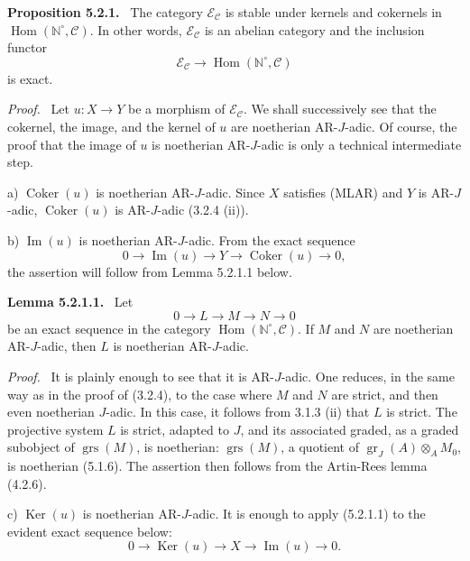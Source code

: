\documentclass[11pt]{article}
\newenvironment{statement}[1]{\par\medskip\noindent\textbf{#1.}\ }{\par\medskip}
\newenvironment{prooftext}[1][Proof]{\par\noindent\emph{#1.}\ }{\par\medskip}
\DeclareMathOperator{\Hom}{Hom}
\providecommand{\Ker}{\operatorname{Ker}}
\providecommand{\Coker}{\operatorname{Coker}}
\providecommand{\gr}{\operatorname{gr}}
\providecommand{\Hom}{\operatorname{Hom}}
\providecommand{\Im}{\operatorname{Im}}
\providecommand{\Ker}{\operatorname{Ker}}
\providecommand{\Coker}{\operatorname{Coker}}
\providecommand{\gr}{\operatorname{gr}}
\renewcommand{\Im}{\operatorname{Im}}
\providecommand{\gr}{\operatorname{gr}}
\providecommand{\grs}{\operatorname{grs}}
\providecommand{\Ker}{\operatorname{Ker}}
\providecommand{\Coker}{\operatorname{Coker}}
\providecommand{\Im}{\operatorname{Im}}
\begin{document}
\begin{statement}{Proposition 5.2.1}
The category \(\mathcal E_{\mathcal C}\) is stable under kernels and cokernels in \(\Hom(\mathbb N^\circ,\mathcal C)\). In other words, \(\mathcal E_{\mathcal C}\) is an abelian category and the inclusion functor
\[
\mathcal E_{\mathcal C}\longrightarrow \Hom(\mathbb N^\circ,\mathcal C)
\]
is exact.
\end{statement}

\begin{prooftext}
Let \(u:X\to Y\) be a morphism of \(\mathcal E_{\mathcal C}\). We shall successively see that the cokernel, the image, and the kernel of \(u\) are noetherian AR-\(J\)-adic. Of course, the proof that the image of \(u\) is noetherian AR-\(J\)-adic is only a technical intermediate step.

a) \(\Coker(u)\) is noetherian AR-\(J\)-adic. Since \(X\) satisfies (MLAR) and \(Y\) is AR-\(J\)-adic, \(\Coker(u)\) is AR-\(J\)-adic (3.2.4 (ii)).

b) \(\Im(u)\) is noetherian AR-\(J\)-adic. From the exact sequence
\[
0\longrightarrow \Im(u)\longrightarrow Y\longrightarrow \Coker(u)\longrightarrow 0,
\]
the assertion will follow from Lemma 5.2.1.1 below.
\end{prooftext}

\begin{statement}{Lemma 5.2.1.1}
Let
\[
0\longrightarrow L\longrightarrow M\longrightarrow N\longrightarrow0
\]
be an exact sequence in the category \(\Hom(\mathbb N^\circ,\mathcal C)\). If \(M\) and \(N\) are noetherian AR-\(J\)-adic, then \(L\) is noetherian AR-\(J\)-adic.
\end{statement}

\begin{prooftext}
It is plainly enough to see that it is AR-\(J\)-adic. One reduces, in the same way as in the proof of (3.2.4), to the case where \(M\) and \(N\) are strict, and then even noetherian \(J\)-adic. In this case, it follows from 3.1.3 (ii) that \(L\) is strict. The projective system \(L\) is strict, adapted to \(J\), and its associated graded, as a graded subobject of \(\grs(M)\), is noetherian: \(\grs(M)\), a quotient of \(\gr_J(A)\otimes_A M_0\), is noetherian (5.1.6). The assertion then follows from the Artin-Rees lemma (4.2.6).
\end{prooftext}

c) \(\Ker(u)\) is noetherian AR-\(J\)-adic. It is enough to apply (5.2.1.1) to the evident exact sequence below:
\[
0\longrightarrow \Ker(u)\longrightarrow X\longrightarrow \Im(u)\longrightarrow0.
\]
\end{document}
